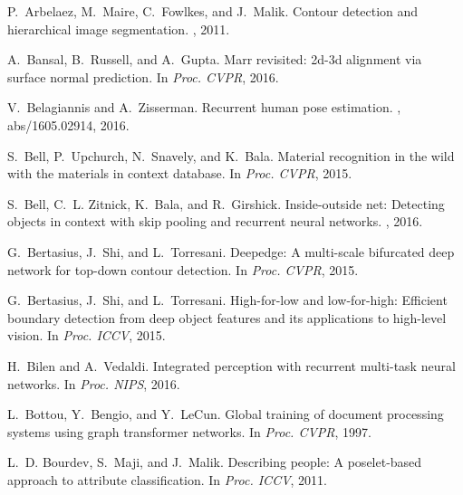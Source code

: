 \documentclass[10pt,twocolumn,letterpaper]{article}
\begin{document}
%
%
\newcommand{\noopsort}[1]{} \newcommand{\printfirst}[2]{#1}
\newcommand{\singleletter}[1]{#1} \newcommand{\switchargs}[2]{#2#1}
\begin{thebibliography}{100}\itemsep=-1pt
	
	P.~Arbelaez, M.~Maire, C.~Fowlkes, and J.~Malik.
	\newblock Contour detection and hierarchical image segmentation.
	, 2011.
	
	A.~Bansal, B.~Russell, and A.~Gupta.
	\newblock Marr revisited: 2d-3d alignment via surface normal prediction.
	\newblock In {\em Proc. {CVPR}}, 2016.
	
	V.~Belagiannis and A.~Zisserman.
	\newblock Recurrent human pose estimation.
	, abs/1605.02914, 2016.
	
	S.~Bell, P.~Upchurch, N.~Snavely, and K.~Bala.
	\newblock Material recognition in the wild with the materials in context
	database.
	\newblock In {\em Proc. {CVPR}}, 2015.
	
	S.~Bell, C.~L. Zitnick, K.~Bala, and R.~Girshick.
	\newblock Inside-outside net: Detecting objects in context with skip pooling
	and recurrent neural networks.
	, 2016.
	
	G.~Bertasius, J.~Shi, and L.~Torresani.
	\newblock Deepedge: {A} multi-scale bifurcated deep network for top-down
	contour detection.
	\newblock In {\em Proc. {CVPR}}, 2015.
	
	G.~Bertasius, J.~Shi, and L.~Torresani.
	\newblock High-for-low and low-for-high: Efficient boundary detection from deep
	object features and its applications to high-level vision.
	\newblock In {\em Proc. {ICCV}}, 2015.
	
	H.~Bilen and A.~Vedaldi.
	\newblock Integrated perception with recurrent multi-task neural networks.
	\newblock In {\em Proc. {NIPS}}, 2016.
	
	L.~Bottou, Y.~Bengio, and Y.~LeCun.
	\newblock Global training of document processing systems using graph
	transformer networks.
	\newblock In {\em Proc. {CVPR}}, 1997.
	
	L.~D. Bourdev, S.~Maji, and J.~Malik.
	\newblock Describing people: {A} poselet-based approach to attribute
	classification.
	\newblock In {\em Proc. {ICCV}}, 2011.
	

\end{thebibliography}
\end{document}

